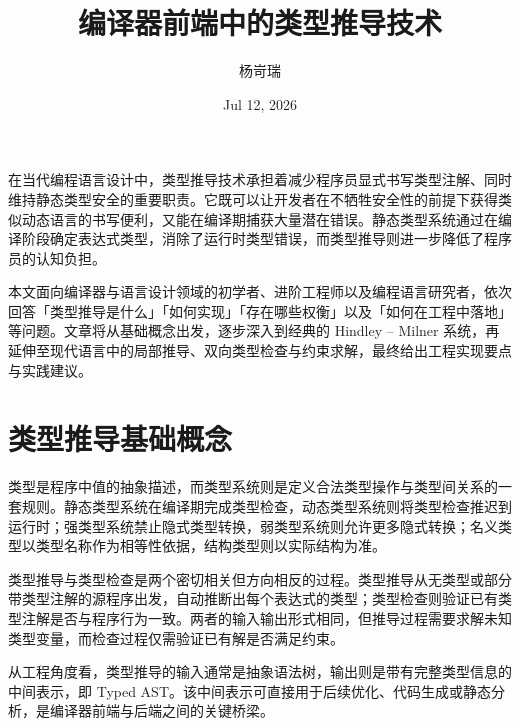 \title{编译器前端中的类型推导技术}
\author{杨岢瑞}
\date{Jul 12, 2026}
\maketitle
在当代编程语言设计中，类型推导技术承担着减少程序员显式书写类型注解、同时维持静态类型安全的重要职责。它既可以让开发者在不牺牲安全性的前提下获得类似动态语言的书写便利，又能在编译期捕获大量潜在错误。静态类型系统通过在编译阶段确定表达式类型，消除了运行时类型错误，而类型推导则进一步降低了程序员的认知负担。\par
本文面向编译器与语言设计领域的初学者、进阶工程师以及编程语言研究者，依次回答「类型推导是什么」「如何实现」「存在哪些权衡」以及「如何在工程中落地」等问题。文章将从基础概念出发，逐步深入到经典的 Hindley – Milner 系统，再延伸至现代语言中的局部推导、双向类型检查与约束求解，最终给出工程实现要点与实践建议。\par
\chapter{类型推导基础概念}
类型是程序中值的抽象描述，而类型系统则是定义合法类型操作与类型间关系的一套规则。静态类型系统在编译期完成类型检查，动态类型系统则将类型检查推迟到运行时；强类型系统禁止隐式类型转换，弱类型系统则允许更多隐式转换；名义类型以类型名称作为相等性依据，结构类型则以实际结构为准。\par
类型推导与类型检查是两个密切相关但方向相反的过程。类型推导从无类型或部分带类型注解的源程序出发，自动推断出每个表达式的类型；类型检查则验证已有类型注解是否与程序行为一致。两者的输入输出形式相同，但推导过程需要求解未知类型变量，而检查过程仅需验证已有解是否满足约束。\par
从工程角度看，类型推导的输入通常是抽象语法树，输出则是带有完整类型信息的中间表示，即 Typed AST。该中间表示可直接用于后续优化、代码生成或静态分析，是编译器前端与后端之间的关键桥梁。\par
